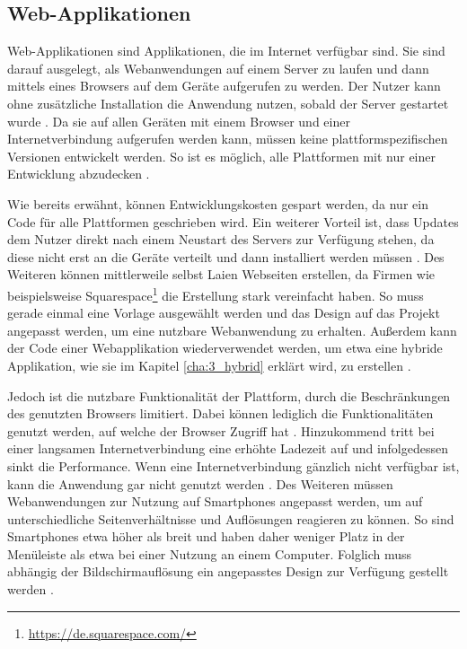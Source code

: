 \subsection{Web-Applikationen}
\label{cha:3_2_web}
Web-Applikationen sind Applikationen, die im Internet verfügbar sind. Sie sind darauf ausgelegt, als Webanwendungen auf einem Server zu laufen und dann mittels eines Browsers auf dem Geräte aufgerufen zu werden. Der Nutzer kann ohne zusätzliche Installation die Anwendung nutzen, sobald der Server gestartet wurde \cite{IEEE_Khackouch_Al}.
Da sie auf allen Geräten mit einem Browser und einer Internetverbindung aufgerufen werden kann, müssen keine plattformspezifischen Versionen entwickelt werden.
So ist es möglich, alle Plattformen mit nur einer Entwicklung abzudecken \cite{IEEE_development_classes}.

Wie bereits erwähnt, können Entwicklungskosten gespart werden, da nur ein Code für alle Plattformen geschrieben wird. Ein weiterer Vorteil ist, dass Updates dem Nutzer direkt nach einem Neustart des Servers zur Verfügung stehen, da diese nicht erst an die Geräte verteilt und dann installiert werden müssen \cite{IEEE_Khackouch_Al}. Des Weiteren können mittlerweile selbst Laien Webseiten erstellen, da Firmen wie beispielsweise Squarespace\footnote{\url{https://de.squarespace.com/}} die Erstellung stark vereinfacht haben. So muss gerade einmal eine Vorlage ausgewählt werden und das Design auf das Projekt angepasst werden, um eine nutzbare Webanwendung zu erhalten. 
Außerdem kann der Code einer Webapplikation wiederverwendet werden, um etwa eine hybride Applikation, wie sie im Kapitel \ref{cha:3_hybrid} erklärt wird, zu erstellen \cite{IEEE_Khackouch_Al}. 

Jedoch ist die nutzbare Funktionalität der Plattform, durch die Beschränkungen des genutzten Browsers limitiert. Dabei können lediglich die Funktionalitäten genutzt werden, auf welche der Browser Zugriff hat \cite{Phyo}. Hinzukommend tritt bei einer langsamen Internetverbindung eine erhöhte Ladezeit auf und infolgedessen sinkt die Performance. Wenn eine Internetverbindung gänzlich nicht verfügbar ist, kann die Anwendung gar nicht genutzt werden \cite{IEEE_Khackouch_Al}. Des Weiteren müssen Webanwendungen zur Nutzung auf Smartphones angepasst werden, um auf unterschiedliche Seitenverhältnisse und Auflösungen reagieren zu können. So sind Smartphones etwa höher als breit und haben daher weniger Platz in der Menüleiste als etwa bei einer Nutzung an einem Computer. Folglich muss abhängig der Bildschirmauflösung ein angepasstes Design zur Verfügung gestellt werden \cite{Serrano_mobile}.

